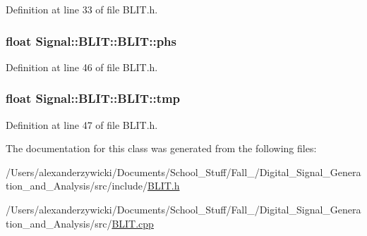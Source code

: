 Definition at line 33 of file B\+L\+I\+T.\+h.

\hypertarget{class_signal_1_1_b_l_i_t_1_1_b_l_i_t_afd06bf26696642f7eb400fb984e524f3}{
\subsubsection[{phs}]{\setlength{\rightskip}{0pt plus 5cm}float Signal\+::\+B\+L\+I\+T\+::\+B\+L\+I\+T\+::phs\hspace{0.3cm}{\ttfamily [protected]}}}\label{class_signal_1_1_b_l_i_t_1_1_b_l_i_t_afd06bf26696642f7eb400fb984e524f3}


Definition at line 46 of file B\+L\+I\+T.\+h.

\hypertarget{class_signal_1_1_b_l_i_t_1_1_b_l_i_t_aa543d207e6dd260762652221c598bae9}{
\subsubsection[{tmp}]{\setlength{\rightskip}{0pt plus 5cm}float Signal\+::\+B\+L\+I\+T\+::\+B\+L\+I\+T\+::tmp\hspace{0.3cm}{\ttfamily [protected]}}}\label{class_signal_1_1_b_l_i_t_1_1_b_l_i_t_aa543d207e6dd260762652221c598bae9}


Definition at line 47 of file B\+L\+I\+T.\+h.



The documentation for this class was generated from the following files\+:\begin{DoxyCompactItemize}
\item 
/\+Users/alexanderzywicki/\+Documents/\+School\+\_\+\+Stuff/\+Fall\+\_/\+Digital\+\_\+\+Signal\+\_\+\+Generation\+\_\+and\+\_\+\+Analysis/src/include/\hyperlink{_b_l_i_t_8h}{B\+L\+I\+T.\+h}\item 
/\+Users/alexanderzywicki/\+Documents/\+School\+\_\+\+Stuff/\+Fall\+\_/\+Digital\+\_\+\+Signal\+\_\+\+Generation\+\_\+and\+\_\+\+Analysis/src/\hyperlink{_b_l_i_t_8cpp}{B\+L\+I\+T.\+cpp}\end{DoxyCompactItemize}
